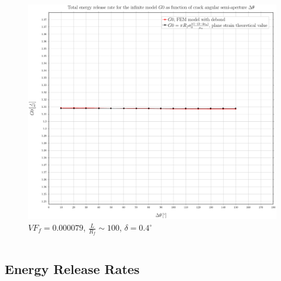 \documentclass[first,firstsupp,lastsupp,last,hyperref,table]{ETHclass}
\begin{document}
\begin{frame}
\begin{columns}
\begin{column}{0.55\textwidth}
\begin{figure}
\includegraphics[width=\columnwidth]{2017-06-16_AbqRunSummary_SingleFiberEqRfSmallStrain-D0-4_G0_Summary.pdf}
\caption{\scriptsize  $VF_{f}=0.000079$, $\frac{L}{R_{f}}\sim 100$, $\delta = 0.4^{\circ}$}
\end{figure}
\end{column}
\end{columns}
\end{frame}

\subsection{Energy Release Rates}
\end{document}
